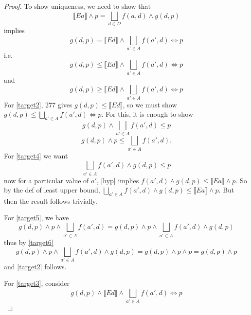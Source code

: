 \documentclass{article}
\newcommand{\lb}{\llbracket}
\newcommand{\rb}{\rrbracket}
\theoremstyle{definition}
\begin{document}
\begin{proof}
    To show uniqueness, we need to show that 
    \begin{equation}\label{hyp}
        \lb Ea \rb \wedge p = \bigsqcup_{d \in D} f(a, d) \wedge g(d, p)
    \end{equation}
    implies 
    \begin{equation}\label{target1}
        g(d, p) = \lb Ed \rb \wedge \bigsqcup_{a' \in A} f(a', d) \Leftrightarrow p 
    \end{equation}
    i.e.
    \begin{equation}\label{target2}
        g(d, p) \leq \lb Ed \rb \wedge \bigsqcup_{a' \in A} f(a', d) \Leftrightarrow p 
    \end{equation}
    and 
    \begin{equation}\label{target3}
        g(d, p) \geq \lb Ed \rb \wedge \bigsqcup_{a' \in A} f(a', d) \Leftrightarrow p 
    \end{equation}
    For \eqref{target2}, 277 gives $g(d, p) \leq \lb Ed \rb$, so we must show $g(d,p) \leq \bigsqcup_{a' \in A} f(a', d) \Leftrightarrow p$.
    For this, it is enough to show
    \begin{equation}\label{target4}
        g(d,p) \wedge \bigsqcup_{a' \in A} f(a', d) \leq p 
    \end{equation}
    \begin{equation}\label{target5}
        g(d,p) \wedge p \leq \bigsqcup_{a' \in A} f(a', d).
    \end{equation}
    For \eqref{target4} we want 
    \begin{equation}\label{target6}
         \bigsqcup_{a' \in A} f(a', d) \wedge g(d, p) \leq p 
    \end{equation}
    now for a particular value of $a'$, \eqref{hyp} implies $f(a', d) \wedge g(d, p) \leq \lb Ea \rb \wedge p$.
    So by the def of least upper bound, $\bigsqcup_{a' \in A} f(a', d) \wedge g(d, p) \leq \lb Ea \rb \wedge p$. But
    then the result follows trivially.

    For \eqref{target5}, we have 
    \[
        g(d,p) \wedge p \wedge \bigsqcup_{a' \in A} f(a', d) =  g(d,p) \wedge p \wedge \bigsqcup_{a' \in A} f(a', d) \wedge g(d, p)
    \]
    thus by \eqref{target6}
    \[
        g(d,p) \wedge p \wedge \bigsqcup_{a' \in A} f(a', d) \wedge g(d, p) = g(d,p) \wedge p \wedge p = g(d,p) \wedge p
    \]
    and \eqref{target2} follows.

    For \eqref{target3}, consider
    \begin{equation}
        g(d, p) \wedge \lb Ed \rb \wedge \bigsqcup_{a' \in A} f(a', d) \Leftrightarrow p 
    \end{equation}
\end{proof}
\end{document}
